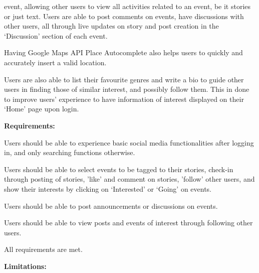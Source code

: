 \documentclass[11pt, a4paper]{article}
\begin{document}
\begin{enumerate*}[label=\textbf{\arabic*})]
event, allowing other users to view all activities related to an event, be it stories or just text.
Users are able to post comments on events, have discussions with other users, all through live
updates on story and post creation in the `Discussion' section of each event.
\item Having Google Maps API Place Autocomplete also helps users to quickly and accurately insert a
valid location.
\item Users are also able to list their favourite genres and write a bio to guide other users in
finding those of similar interest, and possibly follow them. This in done to improve users'
experience to have information of interest displayed on their `Home' page upon login.
\end{enumerate*}
%
\textbf{Requirements:}
\begin{enumerate*}[label=\textbf{\arabic*})]
\item Users should be able to experience basic social media functionalities after logging in, and
only searching functions otherwise.
\item Users should be able to select events to be tagged to their stories, check-in through posting
of stories, 'like' and comment on stories, 'follow' other users, and show their interests by
clicking on `Interested' or `Going' on events.
\item Users should be able to post announcements or discussions on events.
\item Users should be able to view posts and events of interest through following other users.
\item All requirements are met.
\end{enumerate*}
%
\textbf{Limitations:}
\end{document}

